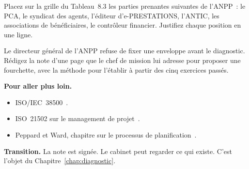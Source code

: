 \begin{boxexo}[title={\ding{45}\quad Exercice~8.3. La grille \niveaumoyen}]
Placez sur la grille du Tableau~8.3 les parties prenantes suivantes de l'ANPP~: le PCA, le syndicat des agents, l'éditeur d'e-PRESTATIONS, l'ANTIC, les associations de bénéficiaires, le contrôleur financier. Justifiez chaque position en une ligne.
\end{boxexo}

\begin{boxexo}[title={\ding{45}\quad Exercice~8.4. Le cadrage sans enveloppe \niveauexpert}]
Le directeur général de l'ANPP refuse de fixer une enveloppe avant le diagnostic. Rédigez la note d'une page que le chef de mission lui adresse pour proposer une fourchette, avec la méthode pour l'établir à partir des cinq exercices passés.
\end{boxexo}

\bigskip

\begin{boxinfo}
\textbf{Pour aller plus loin.}
\begin{itemize}
    \item ISO/IEC~38500~\cite{iso38500}.
    \item ISO~21502 sur le management de projet~\cite{iso21502}.
    \item Peppard et Ward, chapitre sur le processus de planification~\cite{wardpeppard2016}.
\end{itemize}
\end{boxinfo}

\begin{boxinfo}
\textbf{Transition.} La note est signée. Le cabinet peut regarder ce qui existe. C'est l'objet du Chapitre~\ref{chap:diagnostic}.
\end{boxinfo}
